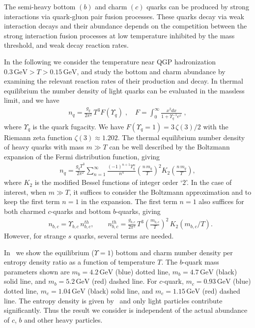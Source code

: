 The semi-heavy bottom $(b)$ and charm $(c)$ quarks can be produced by strong interactions via quark-gluon pair fusion processes. These quarks decay via weak interaction decays and their abundance depends on the competition between the strong interaction fusion processes at low temperature inhibited by the mass threshold, and weak decay reaction rates.

In the following we consider the temperature near QGP hadronization $0.3\,\mathrm{GeV}>T>0.15\,\mathrm{GeV}$, and study the bottom and charm abundance by examining the relevant reaction rates of their production and decay.
In thermal equilibrium the number density of light quarks can be evaluated in the massless limit, and we have
\begin{align}\label{FermiN}
n_q=\frac{g_{q}}{2\pi^2}\,T^3 F(\Upsilon_q)\;, \quad F=\int_0^\infty \frac{x^2dx}{1+\Upsilon_q^{-1}e^x}\;,
\end{align}
where $\Upsilon_q$ is the quark fugacity. We have $ F(\Upsilon_q=1)=3\,\zeta(3)/2$ with the Riemann zeta function $\zeta(3)\approx1.202$.
The thermal equilibrium number density of heavy quarks with mass $m\gg T$ can be well described by the Boltzmann expansion of the Fermi distribution function, giving
\begin{align}\label{BoltzN}
n_{q}\!=\!\frac{g_{q}T^3}{2\pi^2}\sum_{n=1}^{\infty}\frac{(-1)^{n+1}\Upsilon_q^n}{n^4}\left(\frac{n\,m_{q}}{T}\right)^{\!2}\!K_2\left(\frac{n\,m_{q}}{T}\right),
\end{align} 
where $K_2$ is the modified Bessel functions of integer order `$2$'. In the case of interest, when $m\gg T$, it suffices to consider the Boltzmann approximation and to keep the first term $n=1$ in the expansion. The first term $n=1$ also suffices for both charmed $c$-quarks and bottom $b$-quarks, giving
\begin{align}
&n_{b,c}={\Upsilon_{b,c}\,}n^{th}_{b,c},\qquad n^{th}_{b,c}=\frac{g_{b,c}}{2\pi^2}\,T^3\left(\frac{m_{b,c}}{T}\right)^2\,K_2(m_{b,c}/T).
\end{align}
However, for strange $s$ quarks, several terms are needed. 

In~ we show the equilibrium ($\Upsilon=1$) bottom and charm number density per entropy density ratio as a function of temperature $T$. The $b$-quark mass parameters shown are $m_b=4.2\,\mathrm{GeV}$ (blue) dotted line, $m_b=4.7\,\mathrm{GeV}$ (black) solid line, and $m_b=5.2\,\mathrm{GeV}$ (red) dashed line. For $c$-quark, $m_c=0.93\,\mathrm{GeV}$ (blue) dotted line, $m_c=1.04\,\mathrm{GeV}$ (black) solid line, and $m_c=1.15\,\mathrm{GeV}$ (red) dashed line. The entropy density is given by~ and only light particles contribute significantly. Thus the result we consider is independent of the actual abundance of $c$, $b$ and other heavy particles. 

